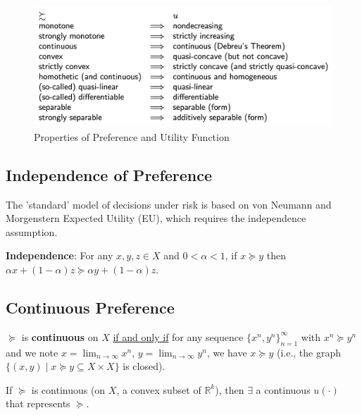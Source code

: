 \documentclass[11pt]{elegantbook}
\begin{document}
\begin{center}\begin{figure}[htbp]
    \centering
    \includegraphics[scale=0.2]{Pref_prop.png}
    \caption{Properties of Preference and Utility Function}
    \label{}
\end{figure}\end{center}


\subsection{Independence of Preference}
The 'standard' model of decisions under risk is based on von Neumann and Morgenstern Expected Utility (EU), which requires the independence assumption.
\begin{definition}
    \normalfont
    \textbf{Independence}: For any $x,y,z\in X$ and $0<\alpha<1$, if $x\succeq y$ then $\alpha x+(1-\alpha)z \succeq \alpha y+(1-\alpha)z$.
\end{definition}



\subsection{Continuous Preference}
\begin{definition}
    \normalfont
    $\succeq$ is \textbf{continuous} on $X$ \underline{if and only if} for any sequence $\{x^n,y^n\}_{n=1}^\infty$ with $x^n\succeq y^n$ and we note $x=\lim_{n \rightarrow \infty}x^n$, $y=\lim_{n \rightarrow \infty}y^n$, we have $x\succeq y$ (i.e., the graph $\{(x,y)\mid x\succeq y\subseteq X\times X\}$ is closed).
\end{definition}
\begin{proposition}
    If $\succeq$ is continuous (on $X$, a convex subset of $\mathbb{R}^k$), then $\exists$ a continuous $u(\cdot)$ that represents $\succeq$.
\end{proposition}
\end{document}
